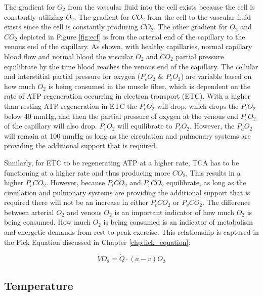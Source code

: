 The gradient for $O_2$ from the vascular fluid into the cell exists because the cell is constantly utilizing $O_2$. The gradient for $CO_2$ from the cell to the vascular fluid exists since the cell is constantly producing $CO_2$. The other gradient for $O_2$ and $CO_2$ depicted in Figure \ref{fig:ecf} is from the arterial end of the capillary to the venous end of the capillary. As shown, with healthy capillaries, normal capillary blood flow and normal blood the vascular $O_2$ and $CO_2$ partial pressure equilibrate by the time blood reaches the venous end of the capillary. The cellular and interstitial partial pressure for oxygen ($P_c O_2$ \& $P_t O_2$) are variable based on how much $O_2$ is being consumed in the muscle fiber, which is dependent on the rate of ATP regeneration occurring in electron transport (ETC). With a higher than resting ATP regeneration in ETC the $P_c O_2$ will drop, which drops the $P_t O_2$ below 40 mmHg, and then the partial pressure of oxygen at the venous end $P_v O_2$ of the capillary will also drop. $P_v O_2$ will equilibrate to $P_t O_2$. However, the $P_a O_2$ will remain at 100 mmHg as long as the circulation and pulmonary systems are providing the additional support that is required.

Similarly, for ETC to be regenerating ATP at a higher rate, TCA has to be functioning at a higher rate and thus producing more $CO_2$. This results in a higher $P_c CO_2$. However, because $P_t CO_2$ and $P_v CO_2$ equilibrate, as long as the circulation and pulmonary systems are providing the additional support that is required there will not be an increase in either $P_t CO_2$ or $P_v CO_2$. The difference between arterial $O_2$ and venous $O_2$ is an important indicator of how much $O_2$ is being consumed. How much $O_2$ is being consumed is an indicator of metabolism and energetic demands from rest to peak exercise. This relationship is captured in the Fick Equation discussed in Chapter \ref{chp:fick_equation}:

\begin{equation}
    \dot{V}O_2 = \dot{Q} \cdot (a-v)O_2
\end{equation}


\subsection{Temperature}

